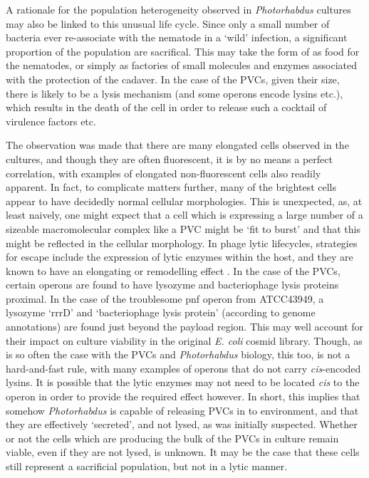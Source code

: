 A rationale for the population heterogeneity observed in \emph{Photorhabdus} cultures may also be linked to this unusual life cycle. Since only a small number of bacteria ever re-associate with the nematode in a `wild' infection, a significant proportion of the population are sacrifical. This may take the form of as food for the nematodes, or simply as factories of small molecules and enzymes associated with the protection of the cadaver. In the case of the PVCs, given their size, there is likely to be a lysis mechanism (and some operons encode lysins etc.), which results in the death of the cell in order to release such a cocktail of virulence factors etc.

The observation was made that there are many elongated cells observed in the cultures, and though they are often fluorescent, it is by no means a perfect correlation, with examples of elongated non-fluorescent cells also readily apparent. In fact, to complicate matters further, many of the brightest cells appear to have decidedly normal cellular morphologies. This is unexpected, as, at least naively, one might expect that a cell which is expressing a large number of a sizeable macromolecular complex like a PVC might be `fit to burst' and that this might be reflected in the cellular morphology. In phage lytic lifecycles, strategies for escape include the expression of lytic enzymes within the host, and they are known to have an elongating or remodelling effect \citep{Young2000}. In the case of the PVCs, certain operons are found to have lysozyme and bacteriophage lysis proteins proximal. In the case of the troublesome pnf operon from \Pasy{} ATCC43949, a lysozyme `rrrD' and `bacteriophage lysis protein' (according to genome annotations) are found just beyond the payload region. This may well account for their impact on culture viability in the original \emph{E. coli} cosmid library. Though, as is so often the case with the PVCs and \emph{Photorhabdus} biology, this too, is not a hard-and-fast rule, with many examples of operons that do not carry \emph{cis}-encoded lysins. It is possible that the lytic enzymes may not need to be located \emph{cis} to the operon in order to provide the required effect however. In short, this implies that somehow \emph{Photorhabdus} is capable of releasing PVCs in to environment, and that they are effectively `secreted', and not lysed, as was initially suspected. Whether or not the cells which are producing the bulk of the PVCs in culture remain viable, even if they are not lysed, is unknown. It may be the case that these cells still represent a sacrificial population, but not in a lytic manner.

